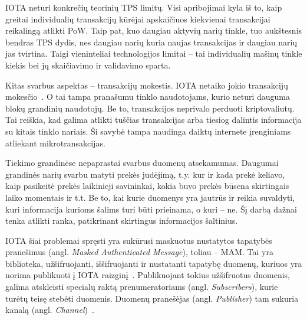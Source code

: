 IOTA neturi konkrečių teorinių TPS limitų. Visi apribojimai kyla iš to, kaip greitai individualių transakcijų kūrėjai apskaičiuos kiekvienai transakcijai reikalingą atlikti PoW. Taip pat, kuo daugiau aktyvių narių tinkle, tuo aukštesnis bendras TPS dydis, nes daugiau narių kuria naujas transakcijas ir daugiau narių jas tvirtina. Taigi vieninteliai technologijos limitai – tai individualių mašinų tinkle kiekis bei jų skaičiavimo ir validavimo sparta.

Kitas svarbus aspektas – transakcijų mokestis. IOTA netaiko jokio transakcijų mokesčio~\cite{zivic2019distributed}. O tai tampa pranašumu tinklo naudotojams, kurio neturi dauguma blokų grandinių naudotojų. Be to, transakcijos neprivalo perduoti kriptovaliutų. Tai reiškia, kad galima atlikti tuščias transakcijas arba tiesiog dalintis informacija su kitais tinklo nariais. Ši savybė tampa naudinga daiktų internete įrenginiams atliekant mikrotransakcijas.




 \label{subsection:dag-mam}

Tiekimo grandinėse nepaprastai svarbus duomenų atsekamumas. Daugumai grandinės narių svarbu matyti prekės judėjimą, t.y. kur ir kada prekė keliavo, kaip pasikeitė prekės laikinieji savininkai, kokia buvo prekės būsena skirtingais laiko momentais ir t.t. Be to, kai kurie duomenys yra jautrūs ir reikia suvaldyti, kuri informacija kurioms šalims turi būti prieinama, o kuri – ne. Šį darbą dažnai tenka atlikti ranka, patikrinant skirtingus informacijos šaltinius.

IOTA šiai problemai spręsti yra sukūrusi maskuotus nustatytos tapatybės pranešimus (angl. \textit{Masked Authenticated Message}), toliau – MAM. Tai yra biblioteka, užšifruojanti, iššifruojanti ir nustatanti tapatybę duomenų, kuriuos yra norima publikuoti į IOTA raizginį~\cite{andreas2017masked}. Publikuojant tokius užšifruotus duomenis, galima atskleisti specialų raktą prenumeratoriams (angl. \textit{Subscribers}), kurie turėtų teisę stebėti duomenis. Duomenų pranešėjas (angl. \textit{Publisher}) tam sukuria kanalą (angl. \textit{Channel})~\cite{ab2018iota}.

